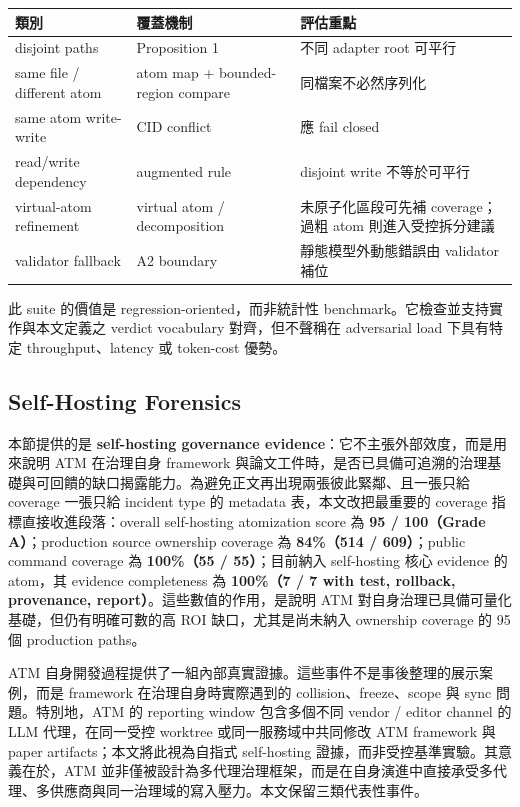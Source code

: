 \documentclass[a4paper,fontset=none]{ctexart}
\begin{document}
\begingroup
\footnotesize
{}
\begin{longtable}{L{0.28\textwidth}L{0.28\textwidth}L{0.28\textwidth}}
\toprule
類別 & 覆蓋機制 & 評估重點 \\
\midrule
disjoint paths & Proposition 1 & 不同 adapter root 可平行 \\
same file / different atom & atom map + bounded-region compare & 同檔案不必然序列化 \\
same atom write-write & CID conflict & 應 fail closed \\
read/write dependency & augmented rule & disjoint write 不等於可平行 \\
virtual-atom refinement & virtual atom / decomposition & 未原子化區段可先補 coverage；過粗 atom 則進入受控拆分建議 \\
validator fallback & A2 boundary & 靜態模型外動態錯誤由 validator 補位 \\
\bottomrule
\end{longtable}
\endgroup

此 suite 的價值是 regression-oriented，而非統計性 benchmark。它檢查並支持實作與本文定義之 verdict vocabulary 對齊，但不聲稱在 adversarial load 下具有特定 throughput、latency 或 token-cost 優勢。

\subsection{Self-Hosting Forensics}

本節提供的是 \textbf{self-hosting governance evidence}：它不主張外部效度，而是用來說明 ATM 在治理自身 framework 與論文工件時，是否已具備可追溯的治理基礎與可回饋的缺口揭露能力。為避免正文再出現兩張彼此緊鄰、且一張只給 coverage 一張只給 incident type 的 metadata 表，本文改把最重要的 coverage 指標直接收進段落：overall self-hosting atomization score 為 \textbf{95 / 100（Grade A）}；production source ownership coverage 為 \textbf{84\%（514 / 609）}；public command coverage 為 \textbf{100\%（55 / 55）}；目前納入 self-hosting 核心 evidence 的 atom，其 evidence completeness 為 \textbf{100\%（7 / 7 with test, rollback, provenance, report）}。這些數值的作用，是說明 ATM 對自身治理已具備可量化基礎，但仍有明確可數的高 ROI 缺口，尤其是尚未納入 ownership coverage 的 95 個 production paths。

ATM 自身開發過程提供了一組內部真實證據。這些事件不是事後整理的展示案例，而是 framework 在治理自身時實際遇到的 collision、freeze、scope 與 sync 問題。特別地，ATM 的 reporting window 包含多個不同 vendor / editor channel 的 LLM 代理，在同一受控 worktree 或同一服務域中共同修改 ATM framework 與 paper artifacts；本文將此視為自指式 self-hosting 證據，而非受控基準實驗。其意義在於，ATM 並非僅被設計為多代理治理框架，而是在自身演進中直接承受多代理、多供應商與同一治理域的寫入壓力。本文保留三類代表性事件。
\end{document}

